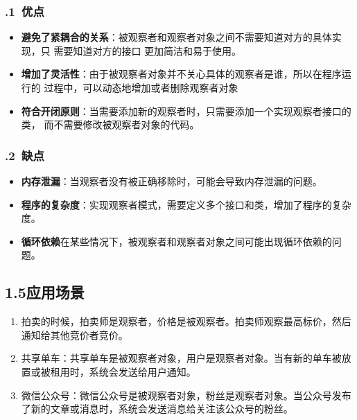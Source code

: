 \documentclass[24pt,a4paper]{article}%
\begin{document}
\subsubsection*{.1\ 优点}
\begin{itemize}
    \item \textbf{避免了紧耦合的关系}：被观察者和观察者对象之间不需要知道对方的具体实现，只
    需要知道对方的接口
    更加简洁和易于使用。
    \item \textbf{增加了灵活性}：由于被观察者对象并不关心具体的观察者是谁，所以在程序运行的
    过程中，可以动态地增加或者删除观察者对象
    \item \textbf{符合开闭原则}：当需要添加新的观察者时，只需要添加一个实现观察者接口的类，
    而不需要修改被观察者对象的代码。
\end{itemize}

\subsubsection*{.2\ 缺点}
\begin{itemize}
    \item \textbf{内存泄漏}：当观察者没有被正确移除时，可能会导致内存泄漏的问题。
    \item \textbf{程序的复杂度}：实现观察者模式，需要定义多个接口和类，增加了程序的复杂度。
    \item \textbf{循环依赖}在某些情况下，被观察者和观察者对象之间可能出现循环依赖的问题。
\end{itemize}

\subsection*{\songti 1.5应用场景}
\begin{enumerate}
    \item 拍卖的时候，拍卖师是观察者，价格是被观察者。拍卖师观察最高标价，然后通知给其他竞价者竞价。
    \item 共享单车：共享单车是被观察者对象，用户是观察者对象。当有新的单车被放置或被租用时，系统会发送给用户通知。
    \item 微信公众号：微信公众号是被观察者对象，粉丝是观察者对象。当公众号发布了新的文章或消息时，系统会发送消息给关注该公众号的粉丝。
\end{enumerate}
\end{document}
